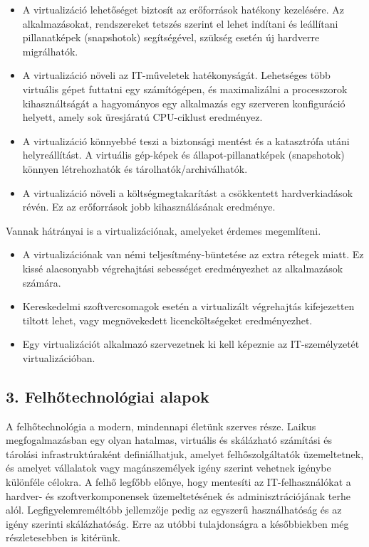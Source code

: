 \documentclass[
]{article}
\providecommand{\tightlist}{%
  \setlength{\itemsep}{0pt}\setlength{\parskip}{0pt}}
\begin{document}
\begin{itemize}
\tightlist
\item
  A virtualizáció lehetőséget biztosít az erőforrások hatékony
  kezelésére. Az alkalmazásokat, rendszereket tetszés szerint el lehet
  indítani és leállítani pillanatképek (snapshotok) segítségével,
  szükség esetén új hardverre migrálhatók.
\item
  A virtualizáció növeli az IT-műveletek hatékonyságát. Lehetséges több
  virtuális gépet futtatni egy számítógépen, és maximalizálni a
  processzorok kihasználtságát a hagyományos egy alkalmazás egy
  szerveren konfiguráció helyett, amely sok üresjáratú CPU-ciklust
  eredményez.
\item
  A virtualizáció könnyebbé teszi a biztonsági mentést és a katasztrófa
  utáni helyreállítást. A virtuális gép-képek és állapot-pillanatképek
  (snapshotok) könnyen létrehozhatók és tárolhatók/archiválhatók.
\item
  A virtualizáció növeli a költségmegtakarítást a csökkentett
  hardverkiadások révén. Ez az erőforrások jobb kihasználásának
  eredménye.
\end{itemize}

Vannak hátrányai is a virtualizációnak, amelyeket érdemes megemlíteni.

\begin{itemize}
\tightlist
\item
  A virtualizációnak van némi teljesítmény-büntetése az extra rétegek
  miatt. Ez kissé alacsonyabb végrehajtási sebességet eredményezhet az
  alkalmazások számára.
\item
  Kereskedelmi szoftvercsomagok esetén a virtualizált végrehajtás
  kifejezetten tiltott lehet, vagy megnövekedett licencköltségeket
  eredményezhet.
\item
  Egy virtualizációt alkalmazó szervezetnek ki kell képeznie az
  IT-személyzetét virtualizációban.
\end{itemize}

\hypertarget{felhux151technoluxf3giai-alapok}{%
\subsection{3. Felhőtechnológiai
alapok}\label{felhux151technoluxf3giai-alapok}}

A felhőtechnológia a modern, mindennapi életünk szerves része. Laikus
megfogalmazásban egy olyan hatalmas, virtuális és skálázható számítási
és tárolási infrastruktúraként definiálhatjuk, amelyet felhőszolgáltatók
üzemeltetnek, és amelyet vállalatok vagy magánszemélyek igény szerint
vehetnek igénybe különféle célokra. A felhő legfőbb előnye, hogy
mentesíti az IT-felhasználókat a hardver- és szoftverkomponensek
üzemeltetésének és adminisztrációjának terhe alól. Legfigyelemreméltóbb
jellemzője pedig az egyszerű használhatóság és az igény szerinti
skálázhatóság. Erre az utóbbi tulajdonságra a későbbiekben még
részletesebben is kitérünk.
\end{document}

